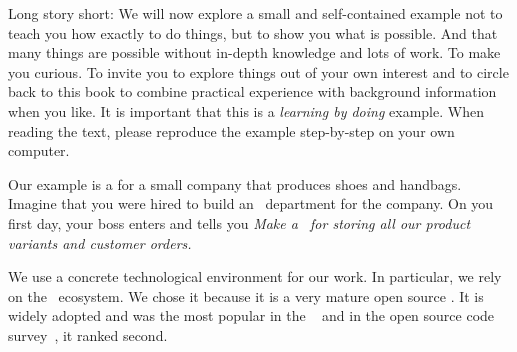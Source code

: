 Long story short:
We will now explore a small and self-contained example not to teach you how exactly to do things, but to show you what is possible.
And that many things are possible without in-depth knowledge and lots of work.
To make you curious.
To invite you to explore things out of your own interest and to circle back to this book to combine practical experience with background information when you like.
It is important that this is a \emph{learning by doing} example.
When reading the text, please reproduce the example step-by-step on your own computer.

Our example is a  for a small company that produces shoes and handbags.
Imagine that you were hired to build an ~department for the company.
On you first day, your boss enters and tells you \emph{Make a \db\ for storing all our product variants and customer orders.}

We use a concrete technological environment for our work.
In particular, we rely on the \postgresql\ ecosystem.
We chose it because it is a very mature open source .
It is widely adopted and was the most popular  in the ~\cite{SE:SO:2024DS} and in the open source code survey~\cite{PMPVEPWGSMB2025ATAODMSTTHOOSP}, it ranked second.%
%
%
%
